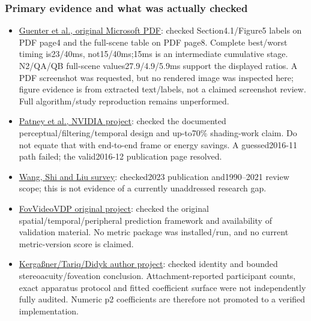 \subsubsection{Primary evidence and what was actually checked}\label{appendix-a103e7846d21-primary-evidence-and-what-was-actually-checked}

\hypertarget{appendix-a103e7846d21-primary-evidence-and-what-was-actually-checked}{}

\begin{itemize}
\tightlist
\item
  \href{https://www.microsoft.com/en-us/research/wp-content/uploads/2012/11/foveated_final15.pdf}{Guenter et al., original Microsoft PDF}: checked Section4.1/Figure5 labels on PDF page4 and the full-scene table on PDF page8. Complete best/worst timing is23/40ms, not15/40ms;15ms is an intermediate cumulative stage. N2/QA/QB full-scene values27.9/4.9/5.9ms support the displayed ratios. A PDF screenshot was requested, but no rendered image was inspected here; figure evidence is from extracted text/labels, not a claimed screenshot review. Full algorithm/study reproduction remains unperformed.
\item
  \href{https://research.nvidia.com/publication/2016-12_towards-foveated-rendering-gaze-tracked-virtual-reality}{Patney et al., NVIDIA project}: checked the documented perceptual/filtering/temporal design and up-to70\% shading-work claim. Do not equate that with end-to-end frame or energy savings. A guessed2016-11 path failed; the valid2016-12 publication page resolved.
\item
  \href{https://link.springer.com/article/10.1007/s41095-022-0306-4}{Wang, Shi and Liu survey}: checked2023 publication and1990--2021 review scope; this is not evidence of a currently unaddressed research gap.
\item
  \href{https://www.cl.cam.ac.uk/research/rainbow/projects/fovvideovdp/}{FovVideoVDP original project}: checked the original spatial/temporal/peripheral prediction framework and availability of validation material. No metric package was installed/run, and no current metric-version score is claimed.
\item
  \href{https://sophie-kergassner.github.io/depth-in-periphery.html}{Kergaßner/Tariq/Didyk author project}: checked identity and bounded stereoacuity/foveation conclusion. Attachment-reported participant counts, exact apparatus protocol and fitted coefficient surface were not independently fully audited. Numeric p2 coefficients are therefore not promoted to a verified implementation.

\end{itemize}
